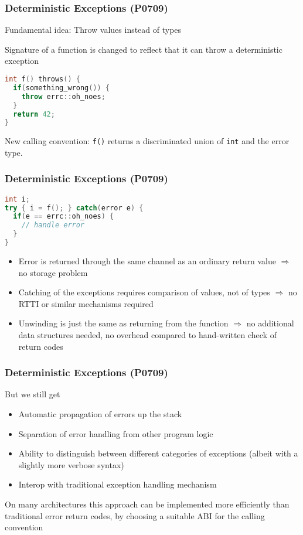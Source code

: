 \documentclass[aspectratio=169]{beamer}
\begin{document}
\begin{frame}[fragile]
  \frametitle{Deterministic Exceptions (P0709)}

  Fundamental idea: Throw values instead of types

  Signature of a function is changed to reflect that it can throw a deterministic exception
  
  \begin{lstlisting}[language={C++}]
int f() throws() {
  if(something_wrong()) {
    throw errc::oh_noes;
  }
  return 42;
}
  \end{lstlisting}

  New calling convention: \texttt{f()} returns a discriminated union of \texttt{int} and the error type.
\end{frame}


\begin{frame}[fragile]
  \frametitle{Deterministic Exceptions (P0709)}
  \begin{lstlisting}[language={C++}]
int i;
try { i = f(); } catch(error e) {
  if(e == errc::oh_noes) {
    // handle error
  }
}
  \end{lstlisting}
  
  \begin{itemize}
  \pause \item Error is returned through the same channel as an ordinary return value $\Rightarrow$ no storage problem
  \pause \item Catching of the exceptions requires comparison of values, not of types $\Rightarrow$ no RTTI or similar mechanisms required
  \pause \item Unwinding is just the same as returning from the function $\Rightarrow$ no additional data structures needed, no overhead compared to hand-written check of return codes
  \end{itemize}
\end{frame}


\begin{frame}[fragile]
  \frametitle{Deterministic Exceptions (P0709)}

  But we still get
  \begin{itemize}
  \pause \item Automatic propagation of errors up the stack
  \pause \item Separation of error handling from other program logic
  \pause \item Ability to distinguish between different categories of exceptions (albeit with a slightly more verbose syntax)
  \pause \item Interop with traditional exception handling mechanism
  \end{itemize}

 \pause 
  On many architectures this approach can be implemented more efficiently than traditional error return codes, by choosing a suitable ABI for the calling convention
\end{frame}
\end{document}
